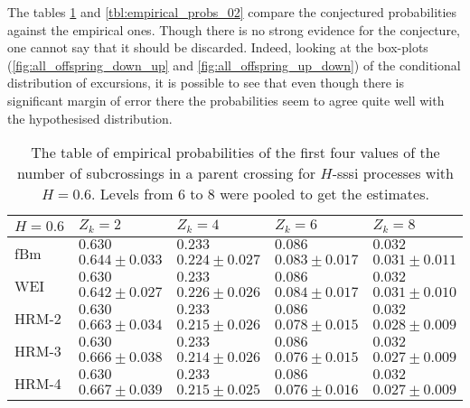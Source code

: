 The tables \ref{tbl:empirical_probs_01} and \ref{tbl:empirical_probs_02} compare the 
conjectured probabilities against the empirical ones. Though there is no strong evidence
for the conjecture, one cannot say that it should be discarded. Indeed, looking at
the box-plots (\ref{fig:all_offspring_down_up} and \ref{fig:all_offspring_up_down})
of the conditional distribution of excursions, it is possible to see that even
though there is significant margin of error there the probabilities seem to agree
quite well with the hypothesised distribution.
\begin{table}[h]\begin{center}
	\begin{tabular}{l||l|l|l|l|}
					$H=0.6$ & $Z_k = 2$ & $Z_k = 4$ & $Z_k = 6$ & $Z_k = 8$ \\ \hline\hline
	\multirow{2}{*}{fBm} 	& $0.630$ & $0.233$ & $0.086$ & $0.032$ \\ \cline{2-5}
							& $0.644\pm0.033$ & $0.224\pm0.027$ & $0.083\pm0.017$ & $0.031\pm0.011$ \\ \hline\hline
	\multirow{2}{*}{WEI} 	& $0.630$ & $0.233$ & $0.086$ & $0.032$ \\ \cline{2-5}
							& $0.642\pm0.027$ & $0.226\pm0.026$ & $0.084\pm0.017$ & $0.031\pm0.010$ \\ \hline\hline
	\multirow{2}{*}{HRM-2} 	& $0.630$ & $0.233$ & $0.086$ & $0.032$ \\ \cline{2-5}
							& $0.663\pm0.034$ & $0.215\pm0.026$ & $0.078\pm0.015$ & $0.028\pm0.009$ \\ \hline\hline
	\multirow{2}{*}{HRM-3} 	& $0.630$ & $0.233$ & $0.086$ & $0.032$ \\ \cline{2-5}
							& $0.666\pm0.038$ & $0.214\pm0.026$ & $0.076\pm0.015$ & $0.027\pm0.009$ \\ \hline\hline
	\multirow{2}{*}{HRM-4} 	& $0.630$ & $0.233$ & $0.086$ & $0.032$ \\ \cline{2-5}
							& $0.667\pm0.039$ & $0.215\pm0.025$ & $0.076\pm0.016$ & $0.027\pm0.009$ \\ \hline\hline
	\end{tabular}
	\caption{The table of empirical probabilities of the first four values of the number
	of subcrossings in a parent crossing for $H$-sssi processes with $H=0.6$. Levels from
	6 to 8 were pooled to get the estimates.}
\label{tbl:empirical_probs_01}
\end{center}\end{table}

